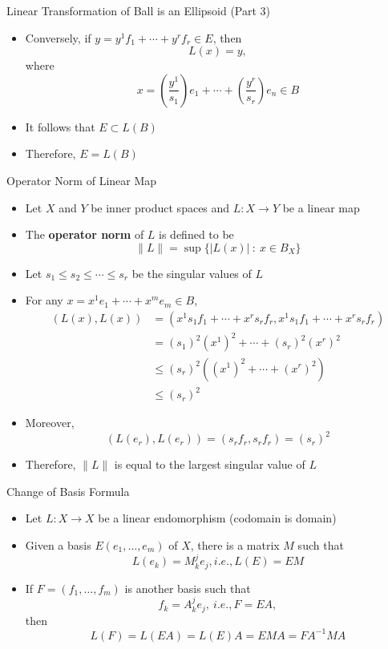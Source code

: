 \documentclass[usenames,dvipsnames,10pt]{beamer}
\begin{document}
\begin{frame}
  {Linear Transformation of Ball is an Ellipsoid (Part 3)}

  \begin{itemize}
  \item 
    Conversely, if $y = y^1f_1 + \cdots + y^rf_r \in E$, then
    \[
      L(x) = y,
    \]
    where
    \[
      x = \left(\frac{y^1}{s_1}\right)e_1 + \cdots + \left(\frac{y^r}{s_r}\right)e_n \in B
    \]
  \item It follows that $E \subset L(B)$
  \item Therefore, $E = L(B)$
  \end{itemize}
\end{frame}

\begin{frame}
  {Operator Norm of Linear Map}

  \begin{itemize}
  \item Let $X$ and $Y$ be inner product spaces and $L: X \rightarrow Y$ be a linear map
  \item The {\bf operator norm} of $L$ is defined to be
    \[
      \|L\| = \sup \{ |L(x)|\ :\ x \in B_X \}
    \]
  \item Let $s_1 \le s_2 \le \cdots \le s_r$ be the singular values of $L$
  \item For any $x = x^1e_1 + \cdots + x^me_m \in B$,
    \begin{align*}
      (L(x),L(x)) &= (x^1s_1f_1 + \cdots + x^rs_r f_r,x^1s_1f_1 + \cdots + x^rs_r f_r) \\
                  &= (s_1)^2(x^1)^2 + \cdots + (s_r)^2(x^r)^2\\
                  &\le (s_r)^2((x^1)^2 + \cdots + (x^r)^2)\\
                  &\le (s_r)^2
    \end{align*}
  \item Moreover,
    \[ (L(e_r),L(e_r)) = (s_rf_r,s_rf_r) = (s_r)^2 \]
  \item Therefore, $\|L\|$ is equal to the largest singular value of $L$
  \end{itemize}
\end{frame}

\begin{frame}
  {Change of Basis Formula}
  \begin{itemize}
  \item Let $L: X \rightarrow X$ be a linear endomorphism (codomain is domain)
  \item Given a basis $E (e_1, \dots, e_m)$ of $X$, there is a matrix $M$ such that
    \[
      L(e_k) = M_k^je_j, i.e., L(E) = EM
    \]
  \item If $F = (f_1,\dots, f_m)$ is another basis such that
    \[
      f_k = A_k^je_j,\ i.e., F = EA,
    \]
    then
    \[
      L(F) = L(EA) = L(E)A = EMA = FA^{-1}MA
    \]
  \end{itemize}
\end{frame}
\end{document}
